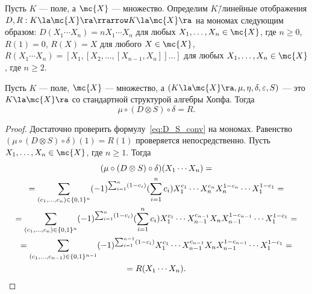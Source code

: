 \documentclass[
	extrafontsizes,
	11pt,
	hyphens,
]{memoir}
\begin{document}
\begin{definition}
Пусть \(K\) --- поле, а \(\mc{X}\) --- множество.
Определим \(K\)\=/линейные отображения \(D, R : K \la \mc{X} \ra \rrarrow K \la \mc{X} \ra\) на мономах следующим образом:
\(D(X_1 \cdots{} X_n) = n X_1 \cdots{} X_n\) для любых \(X_1, \dots{}, X_n \in \mc{X}\), где \(n \geq 0\),
\(R(1) = 0\), \(R(X) = X\) для любого \(X \in \mc{X}\),
\(R(X_1 \cdots{} X_n) = [X_1, [X_2, \dots{}, [X_{n-1}, X_n]] \dots{} ]\) для любых \(X_1, \dots{}, X_n \in \mc{X}\), где \(n \geq 2\).
\end{definition}

\begin{lemma}
Пусть \(K\) --- поле, \(\mc{X}\) --- множество, а \((K \la \mc{X} \ra, \mu, \eta, \delta, \varepsilon, S)\) --- это \(K \la \mc{X} \ra\) со стандартной структурой алгебры Хопфа.
Тогда
\begin{equation}
\mu \circ (D \otimes S) \circ \delta = R.%
\label{eq:D_S_conv}
\end{equation}
\end{lemma}

\begin{proof}
Достаточно проверить формулу~\eqref{eq:D_S_conv} на мономах. Равенство
\((\mu \circ (D \otimes S) \circ \delta)(1) = R(1)\)
проверяется непосредственно.
Пусть \(X_1, \dots{}, X_n \in \mc{X}\), где \(n \geq 1\).
Тогда
\begin{gather*}
(\mu \circ (D \otimes S) \circ \delta)
(X_1 \cdots{} X_n)
=
\\
=
\sum_{(c_1, \dots{}, c_n) \in \{0,1\}^n}
(-1)^{\sum_{i=1}^n (1 - c_i)}
(\sum_{i=1}^n c_i)
X_1^{c_1} \cdots{} X_n^{c_n} X_n^{1 - c_n} \cdots{} X_1^{1 - c_1}
=
\\
=
\sum_{(c_1, \dots{}, c_n) \in \{0,1\}^n}
(-1)^{\sum_{i=1}^n (1 - c_i)}
(\sum_{i=1}^n c_i)
X_1^{c_1} \cdots{} X_{n-1}^{c_{n-1}} X_n X_{n-1}^{1 - c_{n-1}} \cdots{} X_1^{1 - c_1}
=
\\
=
\sum_{(c_1, \dots{}, c_{n-1}) \in \{0,1\}^{n-1}}
(-1)^{\sum_{i=1}^{n-1} (1 - c_i)}
X_1^{c_1} \cdots{} X_{n-1}^{c_{n-1}} X_n X_{n-1}^{1 - c_{n-1}} \cdots{} X_1^{1 - c_1}
=
\\
=
R(X_1 \cdots{} X_n).
\qedhere
\end{gather*}
\end{proof}
\end{document}
